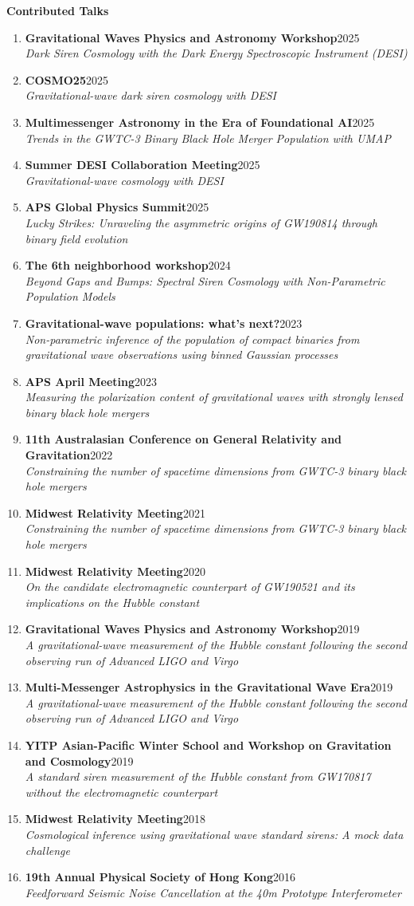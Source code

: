 \documentclass[letterpaper,10pt]{article}
\newcommand{\resheading}[1]{{\large \colorbox{mygrey}{\begin{minipage}{\dimexpr\textwidth-2\fboxsep\relax}{\textbf{#1 \vphantom{p\^{E}}}}\end{minipage}}}}
\newcommand{\presentation}[3]{%
\textbf{#1}\hfill #2\\
\textit{#3}}
\begin{document}
\resheading{Contributed Talks}
\begin{enumerate}
\item 
	\presentation{Gravitational Waves Physics and Astronomy Workshop}{2025}{Dark Siren Cosmology with the Dark Energy Spectroscopic Instrument (DESI)
}
\item 
	\presentation{COSMO25}{2025}{Gravitational-wave dark siren cosmology with DESI}
\item 
	\presentation{Multimessenger Astronomy in the Era of Foundational AI}{2025}{Trends in the GWTC-3 Binary Black Hole Merger Population with UMAP}
\item 
	\presentation{Summer DESI Collaboration Meeting}{2025}{Gravitational-wave cosmology with DESI}
\item 
	\presentation{APS Global Physics Summit}{2025}{Lucky Strikes: Unraveling the asymmetric origins of GW190814 through binary field evolution}
\item 
	\presentation{The 6th neighborhood workshop}{2024}{Beyond Gaps and Bumps: Spectral Siren Cosmology with Non-Parametric Population Models}
\item 
	\presentation{Gravitational-wave populations: what’s next?}{2023}{Non-parametric inference of the population of compact binaries from gravitational wave observations using binned Gaussian processes}
\item 
	\presentation{APS April Meeting}{2023}{Measuring the polarization content of gravitational waves with strongly lensed binary black hole mergers}
\item
	\presentation{11th Australasian Conference on General Relativity and Gravitation}{2022}{Constraining the number of spacetime dimensions from GWTC-3 binary black hole mergers}
\item
	\presentation{Midwest Relativity Meeting}{2021}{Constraining the number of spacetime dimensions from GWTC-3 binary black hole mergers}
\item
	\presentation{Midwest Relativity Meeting}{2020}{On the candidate electromagnetic counterpart of GW190521 and its implications on the Hubble constant}
\item
	\presentation{Gravitational Waves Physics and Astronomy Workshop}{2019}{A gravitational-wave measurement of the Hubble constant following the second observing run of Advanced LIGO and Virgo}
\item
	\presentation{Multi-Messenger Astrophysics in the Gravitational Wave Era}{2019}{A gravitational-wave measurement of the Hubble constant following the second observing run of Advanced LIGO and Virgo}
\item
	\presentation{YITP Asian-Pacific Winter School and Workshop on Gravitation and Cosmology}{2019}{A standard siren measurement of the Hubble constant from GW170817 without the electromagnetic counterpart}
\item
	\presentation{Midwest Relativity Meeting}{2018}{Cosmological inference using gravitational wave standard sirens: A mock data challenge}
\item
	\presentation{19th Annual Physical Society of Hong Kong}{2016}{Feedforward Seismic Noise Cancellation at the 40m Prototype Interferometer}


\end{enumerate}
\end{document}
